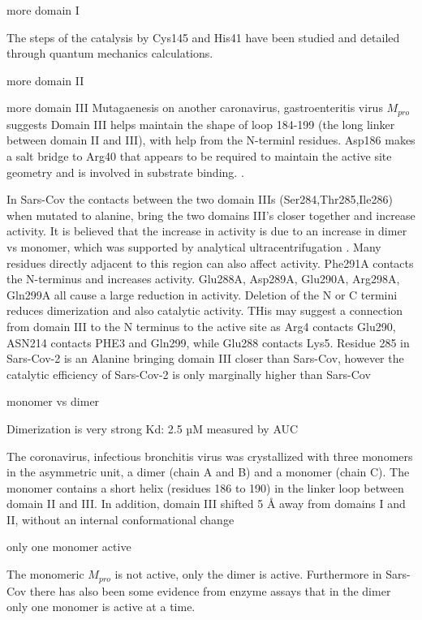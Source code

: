 \documentclass{biophys-new}
\begin{document}
more domain I

The steps of the catalysis by Cys145 and His41 have been studied and detailed through quantum mechanics calculations. \cite{swiderek2020revealing}

more domain II

more domain III
Mutagaenesis on another caronavirus, gastroenteritis virus $M_{pro}$ suggests Domain III helps maintain the shape of loop 184-199 (the long linker between domain II and III), with help from the N-terminl residues. Asp186 makes a salt bridge to Arg40 that appears to be required to maintain the active site geometry and is involved in substrate binding. \cite{anand2002structure}.

In Sars-Cov the contacts between the two domain IIIs (Ser284,Thr285,Ile286) when mutated to alanine, bring the two domains III's closer together and increase activity.\cite{shi2006catalysis} It is believed that the increase in activity is due to an increase in dimer vs monomer, which was supported by analytical ultracentrifugation \cite{hsu2005critical}. Many residues directly adjacent to this region can also affect activity. Phe291A contacts the N-terminus and increases activity. Glu288A, Asp289A, Glu290A, Arg298A, Gln299A all cause a large reduction in activity. Deletion of the N or C termini reduces dimerization and also catalytic activity.\cite{shi2006catalysis}\cite{shi2004dissection} THis may suggest a connection from domain III to the N terminus to the active site as Arg4 contacts Glu290, ASN214 contacts PHE3 and Gln299, while Glu288 contacts Lys5. Residue 285 in Sars-Cov-2 is an Alanine bringing domain III closer than Sars-Cov, however the catalytic efficiency of Sars-Cov-2 is only marginally higher than Sars-Cov \cite{Zhang409} 

 
monomer vs dimer

Dimerization is very strong Kd: 2.5 µM measured by AUC \cite{Zhang409}

The coronavirus, infectious bronchitis virus was crystallized with three monomers in the asymmetric unit, a dimer (chain A and B) and a monomer (chain C)\cite{xue2008structures}. The monomer contains a short helix (residues 186 to 190) in the linker loop between domain II and III. In addition, domain III shifted 5 Å away from domains I and II, without an internal conformational change

only one monomer active

The monomeric $M_{pro}$ is not active, only the dimer is active. Furthermore in Sars-Cov there has also been some evidence from enzyme assays that in the dimer only one monomer is active at a time\cite{chen2006only}. 
\end{document}

